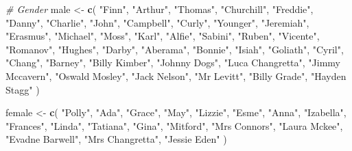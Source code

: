 \documentclass[
]{article}
\newenvironment{Shaded}{\begin{snugshade}}{\end{snugshade}}
\newcommand{\CommentTok}[1]{\textcolor[rgb]{0.56,0.35,0.01}{\textit{#1}}}
\newcommand{\FunctionTok}[1]{\textcolor[rgb]{0.13,0.29,0.53}{\textbf{#1}}}
\newcommand{\NormalTok}[1]{#1}
\newcommand{\OtherTok}[1]{\textcolor[rgb]{0.56,0.35,0.01}{#1}}
\newcommand{\StringTok}[1]{\textcolor[rgb]{0.31,0.60,0.02}{#1}}
\begin{document}
\begin{Shaded}
\begin{Highlighting}[]
\CommentTok{\# Gender}
\NormalTok{male }\OtherTok{\textless{}{-}} \FunctionTok{c}\NormalTok{(}
  \StringTok{"Finn"}\NormalTok{, }\StringTok{"Arthur"}\NormalTok{, }\StringTok{"Thomas"}\NormalTok{, }\StringTok{"Churchill"}\NormalTok{, }\StringTok{"Freddie"}\NormalTok{, }\StringTok{"Danny"}\NormalTok{,}
  \StringTok{"Charlie"}\NormalTok{, }\StringTok{"John"}\NormalTok{, }\StringTok{"Campbell"}\NormalTok{, }\StringTok{"Curly"}\NormalTok{, }\StringTok{"Younger"}\NormalTok{, }\StringTok{"Jeremiah"}\NormalTok{,}
  \StringTok{"Erasmus"}\NormalTok{, }\StringTok{"Michael"}\NormalTok{, }\StringTok{"Moss"}\NormalTok{, }\StringTok{"Karl"}\NormalTok{, }\StringTok{"Alfie"}\NormalTok{, }\StringTok{"Sabini"}\NormalTok{,}
  \StringTok{"Ruben"}\NormalTok{, }\StringTok{"Vicente"}\NormalTok{, }\StringTok{"Romanov"}\NormalTok{, }\StringTok{"Hughes"}\NormalTok{, }\StringTok{"Darby"}\NormalTok{, }\StringTok{"Aberama"}\NormalTok{,}
  \StringTok{"Bonnie"}\NormalTok{, }\StringTok{"Isiah"}\NormalTok{, }\StringTok{"Goliath"}\NormalTok{, }\StringTok{"Cyril"}\NormalTok{, }\StringTok{"Chang"}\NormalTok{, }\StringTok{"Barney"}\NormalTok{,}
  \StringTok{"Billy Kimber"}\NormalTok{, }\StringTok{"Johnny Dogs"}\NormalTok{, }\StringTok{"Luca Changretta"}\NormalTok{, }\StringTok{"Jimmy Mccavern"}\NormalTok{,}
  \StringTok{"Oswald Mosley"}\NormalTok{, }\StringTok{"Jack Nelson"}\NormalTok{, }\StringTok{"Mr Levitt"}\NormalTok{, }\StringTok{"Billy Grade"}\NormalTok{,}
  \StringTok{"Hayden Stagg"}
\NormalTok{)}

\NormalTok{female }\OtherTok{\textless{}{-}} \FunctionTok{c}\NormalTok{(}
  \StringTok{"Polly"}\NormalTok{, }\StringTok{"Ada"}\NormalTok{, }\StringTok{"Grace"}\NormalTok{, }\StringTok{"May"}\NormalTok{, }\StringTok{"Lizzie"}\NormalTok{, }\StringTok{"Esme"}\NormalTok{, }\StringTok{"Anna"}\NormalTok{,}
  \StringTok{"Izabella"}\NormalTok{, }\StringTok{"Frances"}\NormalTok{, }\StringTok{"Linda"}\NormalTok{, }\StringTok{"Tatiana"}\NormalTok{, }\StringTok{"Gina"}\NormalTok{, }\StringTok{"Mitford"}\NormalTok{,}
  \StringTok{"Mrs Connors"}\NormalTok{, }\StringTok{"Laura Mckee"}\NormalTok{, }\StringTok{"Evadne Barwell"}\NormalTok{, }\StringTok{"Mrs Changretta"}\NormalTok{,}
  \StringTok{"Jessie Eden"}
\NormalTok{)}


\end{Highlighting}
\end{Shaded}
\end{document}
